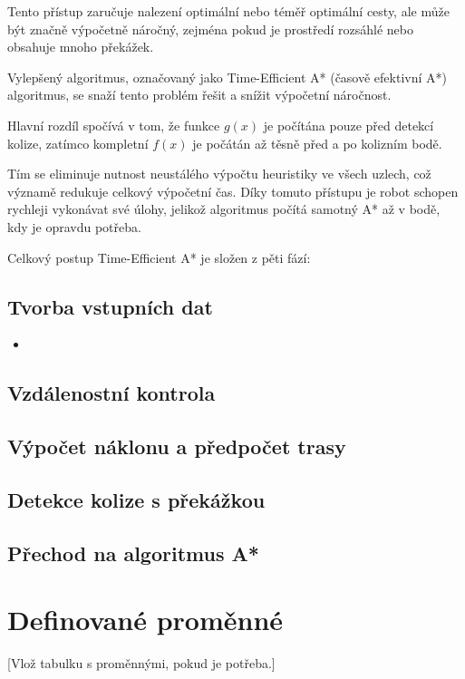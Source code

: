 \documentclass[10pt, a4paper]{article}
\begin{document}
Tento přístup zaručuje nalezení optimální nebo téměř optimální cesty, ale může být značně výpočetně náročný, zejména pokud je prostředí rozsáhlé nebo obsahuje mnoho překážek.

Vylepšený algoritmus, označovaný jako Time-Efficient A* (časově efektivní A*) algoritmus, se snaží tento problém řešit a snížit výpočetní náročnost.

Hlavní rozdíl spočívá v tom, že funkce $g(x)$ je počítána pouze před detekcí kolize, zatímco kompletní $f(x)$ je počátán až těsně před a po kolizním bodě.

Tím se eliminuje nutnost neustálého výpočtu heuristiky ve všech uzlech, což významě redukuje celkový výpočetní čas.
Díky tomuto přístupu je robot schopen rychleji vykonávat své úlohy, jelikož algoritmus počítá samotný A* až v bodě, kdy je opravdu potřeba.

Celkový postup Time-Efficient A* je složen z pěti fází:

\subsection{Tvorba vstupních dat}
\begin{itemize}
    \item

\end{itemize}

\subsection{Vzdálenostní kontrola}

\subsection{Výpočet náklonu a předpočet trasy}

\subsection{Detekce kolize s překážkou}

\subsection{Přechod na algoritmus A*}

\section{Definované proměnné}
[Vlož tabulku s proměnnými, pokud je potřeba.]
\end{document}
